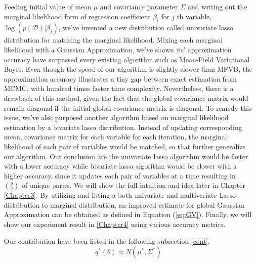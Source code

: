 Feeding initial value of mean $\mu$ and covariance parameter $\Sigma$ and writing out the marginal likelihood form of regression coefficient $\beta_i$ for $j$ th variable, $\log(p(\mathcal{D})|\beta_j)$, we've invented a new distribution called univariate lasso distribution for matching the marginal likelihood. Mixing each marginal likelihood with a Gaussian Approximation, we've shown its' approximation accuracy have surpassed every existing algorithm such as Mean-Field Variational Bayes. Even though the speed of our algorithm is slightly slower than MFVB, the approximation accuracy illustrates a tiny gap between exact estimation from MCMC, with hundred times faster time complexity.
Nevertheless, there is a drawback of this method, given the fact that the global covariance matrix would remain diagonal if the initial global covariance matrix is diagonal.
To remedy this issue, we've also purposed another algorithm based on marginal likelihood estimation by a bivariate lasso distribution. Instead of updating corresponding mean, covariance matrix for each variable for each iteration, the marginal likelihood of each pair of variables would be matched, so that further generalize our algorithm. Our conclusion are the univariate lasso algorithm would be faster with a lower accuracy while bivariate lasso algorithm would be slower with a higher accuracy, since it updates each pair of variables at a time resulting in ${p\choose 2}$ of unique parirs. We will show the full intuition and idea later in Chapter \ref{Chapter3}.
By utilizing and fitting a both univariate and multivariate Lasso distribution to marginal distribution, an improved estimate for global Gaussian Approximation can be obtained as defined in Equation (\ref{eq:GV}). Finally, we will show our experiment result in \ref{Chapter4} using various accuracy metrics.

Our contribution have been listed in the following subsection \ref{cont}.
\begin{equation}
	\label{eq:GV}
	q^{*}(\theta) \approx N(\mu^*,\Sigma^*)
\end{equation}

